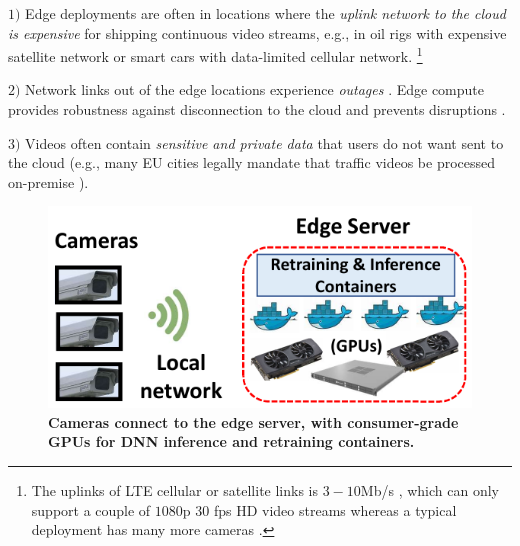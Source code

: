 $1)$ Edge deployments are often in locations where the {\em uplink network to the cloud is expensive} for shipping continuous video streams, %
e.g., in oil rigs with expensive satellite network or smart cars with data-limited cellular network. %
\footnote{The uplinks of LTE cellular or satellite links is $3-10$Mb/s \cite{39-getmobile, 57-getmobile}, which can only support a couple of $1080$p 30 fps HD video streams whereas a typical deployment has many more cameras \cite{getmobile}.}

$2)$ Network links out of the edge locations experience {\em outages} \cite{20-getmobile, getmobile}. %
Edge compute provides robustness against disconnection to the cloud \cite{chick-fill} and prevents disruptions \cite{37-getmobile}. 

$3)$ Videos often contain {\em sensitive and private data} that users do not want sent to the cloud (e.g., many EU cities legally mandate that traffic videos be processed on-premise \cite{sweden-data, azure-data}). %

 \begin{figure}[t!]
     \centering
     \includegraphics[width=0.6\columnwidth]{ekya/figures/xxx_cropped.pdf}
     \caption{\bf\small Cameras connect to the edge server, with consumer-grade GPUs for DNN inference and retraining containers.%
     }
     \label{fig:edge}
 \end{figure}

